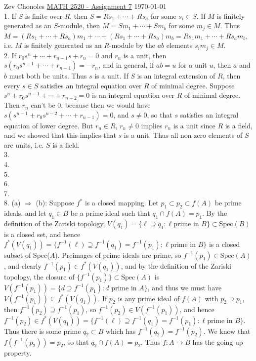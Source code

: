 \documentclass[11pt]{article}
\begin{document}
Zev Chonoles \hfill 
\underline{MATH 2520 - Assignment 7} \hfill \today\\

\num{1.} If $S$ is finite over $R$, then $S=Rs_1+\cdots+Rs_a$
for some $s_i\in S$. If $M$ is finitely generated as an
$S$-module, then $M=Sm_1+\cdots+Sm_b$ for some $m_j\in M$. Thus
$M=(Rs_1+\cdots+Rs_a)m_1+\cdots+(Rs_1+\cdots+Rs_a)m_b=Rs_1m_1+\cdots+Rs_am_b$,
i.e. $M$ is finitely generated as an $R$-module by the $ab$ elements
$s_im_j\in M$.      \\

\num{2.} If $r_0s^n+\cdots+r_{n-1}s+r_n=0$ and $r_n$ is a unit, then
$s(r_0s^{n-1}+\cdots+r_{n-1})=-r_n$, and in general, if $ab=u$ for a unit
$u$, then $a$ and $b$ must both be units. Thus $s$ is a unit. If $S$ is an
integral extension of $R$, then every $s\in S$ satisfies an integral equation
over $R$ of minimal degree. Suppose $s^n+r_0s^{n-1}+\cdots+r_{n-2}=0$ is an
integral equation over $R$ of minimal degree. Then $r_n$ can't be 0, because
then we would have $s(s^{n-1}+r_0s^{n-2}+\cdots+r_{n-1})=0$, and $s\neq 0$,
so that $s$ satisfies an integral equation of lower degree. But $r_n\in R$,
$r_n\neq 0$ implies $r_n$ is a unit since $R$ is a field, and we showed that
this implies that $s$ is a unit. Thus all non-zero elements of $S$ are units,
i.e. $S$ is a field.       \\

\num{3.}       \\

\num{4.}       \\

\num{5.}       \\

\num{6.}       \\

\num{7.}       \\

\num{8.} (a) $\Rightarrow$ (b): Suppose $f^*$ is a closed mapping. Let
$p_1\subset p_2\subset f(A)$ be prime ideals, and let $q_1\in B$
be a prime ideal such that $q_1\cap f(A)=p_1$. By the definition
of the Zariski topology, $V(q_1)=\{\ell\supseteq q_1:\ell\text{
prime in }B\}\subset\text{Spec}(B)$ is a closed set, and hence
$f^*(V(q_1))=\{f^{-1}(\ell)\supseteq f^{-1}(q_1)=f^{-1}(p_1):\ell\text{
prime in }B\}$ is a closed subset of Spec($A$). Preimages of prime
ideals are prime, so $f^{-1}(p_1)\in\text{Spec}(A)$, and clearly
$f^{-1}(p_1)\in f^*(V(q_1))$, and by the definition of the Zariski
topology, the closure of $\{f^{-1}(p_1)\}\subset\text{Spec}(A)$ is
$V(f^{-1}(p_1))=\{d\supseteq f^{-1}(p_1):d\text{ prime in }A\}$, and
thus we must have $V(f^{-1}(p_1))\subseteq f^*(V(q_1))$. If $p_2$ is any
prime ideal of $f(A)$ with $p_2\supseteq p_1$, then $f^{-1}(p_2)\supseteq
f^{-1}(p_1)$, so $f^{-1}(p_2)\in  V(f^{-1}(p_1))$, and hence $f^{-1}(p_2)\in
f^*(V(q_1))=\{f^{-1}(\ell)\supseteq f^{-1}(q_1)=f^{-1}(p_1):\ell\text{
prime in }B\}$. Thus there is some prime $q_2\subset B$ which has
$f^{-1}(q_2)=f^{-1}(p_2)$. We know that $f(f^{-1}(p_2))=p_2$, so that $q_2\cap
f(A)=p_2$. Thus $f:A\rightarrow B$ has the going-up property.\\
\end{document}
